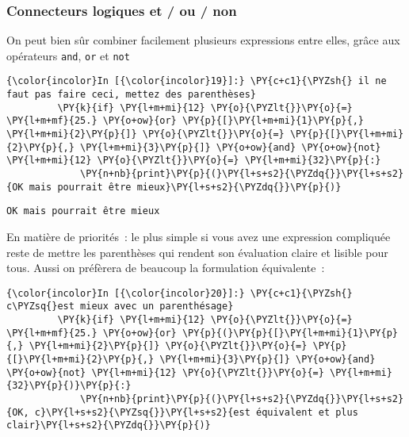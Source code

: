     \hypertarget{connecteurs-logiques-et-ou-non}{%
\subsubsection{Connecteurs logiques et / ou /
non}\label{connecteurs-logiques-et-ou-non}}

    On peut bien sûr combiner facilement plusieurs expressions entre elles,
grâce aux opérateurs \texttt{and}, \texttt{or} et \texttt{not}

    \begin{Verbatim}[commandchars=\\\{\},frame=single,framerule=0.3mm,rulecolor=\color{cellframecolor}]
{\color{incolor}In [{\color{incolor}19}]:} \PY{c+c1}{\PYZsh{} il ne faut pas faire ceci, mettez des parenthèses}
         \PY{k}{if} \PY{l+m+mi}{12} \PY{o}{\PYZlt{}}\PY{o}{=} \PY{l+m+mf}{25.} \PY{o+ow}{or} \PY{p}{[}\PY{l+m+mi}{1}\PY{p}{,} \PY{l+m+mi}{2}\PY{p}{]} \PY{o}{\PYZlt{}}\PY{o}{=} \PY{p}{[}\PY{l+m+mi}{2}\PY{p}{,} \PY{l+m+mi}{3}\PY{p}{]} \PY{o+ow}{and} \PY{o+ow}{not} \PY{l+m+mi}{12} \PY{o}{\PYZlt{}}\PY{o}{=} \PY{l+m+mi}{32}\PY{p}{:}
             \PY{n+nb}{print}\PY{p}{(}\PY{l+s+s2}{\PYZdq{}}\PY{l+s+s2}{OK mais pourrait être mieux}\PY{l+s+s2}{\PYZdq{}}\PY{p}{)}
\end{Verbatim}


    \begin{Verbatim}[commandchars=\\\{\},frame=single,framerule=0.3mm,rulecolor=\color{cellframecolor}]
OK mais pourrait être mieux
\end{Verbatim}

    En matière de priorités~: le plus simple si vous avez une expression
compliquée reste de mettre les parenthèses qui rendent son évaluation
claire et lisible pour tous. Aussi on préfèrera de beaucoup la
formulation équivalente~:

    \begin{Verbatim}[commandchars=\\\{\},frame=single,framerule=0.3mm,rulecolor=\color{cellframecolor}]
{\color{incolor}In [{\color{incolor}20}]:} \PY{c+c1}{\PYZsh{} c\PYZsq{}est mieux avec un parenthésage}
         \PY{k}{if} \PY{l+m+mi}{12} \PY{o}{\PYZlt{}}\PY{o}{=} \PY{l+m+mf}{25.} \PY{o+ow}{or} \PY{p}{(}\PY{p}{[}\PY{l+m+mi}{1}\PY{p}{,} \PY{l+m+mi}{2}\PY{p}{]} \PY{o}{\PYZlt{}}\PY{o}{=} \PY{p}{[}\PY{l+m+mi}{2}\PY{p}{,} \PY{l+m+mi}{3}\PY{p}{]} \PY{o+ow}{and} \PY{o+ow}{not} \PY{l+m+mi}{12} \PY{o}{\PYZlt{}}\PY{o}{=} \PY{l+m+mi}{32}\PY{p}{)}\PY{p}{:}
             \PY{n+nb}{print}\PY{p}{(}\PY{l+s+s2}{\PYZdq{}}\PY{l+s+s2}{OK, c}\PY{l+s+s2}{\PYZsq{}}\PY{l+s+s2}{est équivalent et plus clair}\PY{l+s+s2}{\PYZdq{}}\PY{p}{)}
\end{Verbatim}


